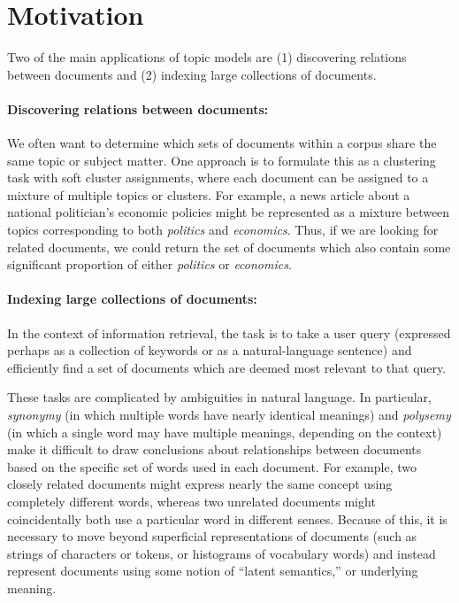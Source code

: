 \documentclass{article}
\begin{document}
\section{Motivation}
Two of the main applications of topic models are (1) discovering relations between documents and (2) indexing large collections of documents.

\paragraph{Discovering relations between documents:}
We often want to determine which sets of documents within a corpus share the same topic or subject matter.
One approach is to formulate this as a clustering task with soft cluster assignments, where each document can be assigned to a mixture of multiple topics or clusters.
For example, a news article about a national politician's economic policies might be represented as a mixture between topics corresponding to both \emph{politics} and \emph{economics}.
Thus, if we are looking for related documents, we could return the set of documents which also contain some significant proportion of either \emph{politics} or \emph{economics}.

\paragraph{Indexing large collections of documents:}
In the context of information retrieval, the task is to take a user query (expressed perhaps as a collection of keywords or as a natural-language sentence) and efficiently find a set of documents which are deemed most relevant to that query.

These tasks are complicated by ambiguities in natural language.
In particular, \emph{synonymy} (in which multiple words have nearly identical meanings) and \emph{polysemy} (in which a single word may have multiple meanings, depending on the context) make it difficult to draw conclusions about relationships between documents based on the specific set of words used in each document.
For example, two closely related documents might express nearly the same concept using completely different words, whereas two unrelated documents might coincidentally both use a particular word in different senses.
Because of this, it is necessary to move beyond superficial representations of documents (such as strings of characters or tokens, or histograms of vocabulary words) and instead represent documents using some notion of ``latent semantics,'' or underlying meaning.
\end{document}

